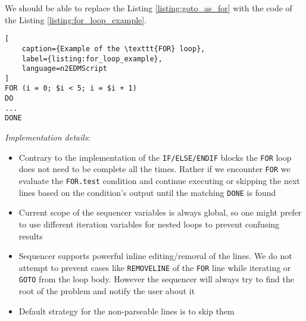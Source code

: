 We should be able to replace the Listing \ref{listing:goto_as_for} with the code of the Listing \ref{listing:for_loop_example}.
\begin{lstlisting}[
	caption={Example of the \texttt{FOR} loop}, 
	label={listing:for_loop_example},
	language=n2EDMScript
]
FOR (i = 0; $i < 5; i = $i + 1)
DO
...
DONE
\end{lstlisting}

\textit{Implementation details}: 

\begin{itemize}
	\item Contrary to the implementation of the \texttt{IF/ELSE/ENDIF} blocks the \texttt{FOR} loop does not need to be complete all the times. Rather if we encounter \texttt{FOR} we evaluate the \texttt{FOR.test} condition and continue executing or skipping the next lines based on the condition's output until the matching \texttt{DONE} is found
	\item Current scope of the sequencer variables is always global, so one might prefer to use different iteration variables for nested loops to prevent confusing results
	\item Sequencer supports powerful inline editing/removal of the lines. We do not attempt to prevent cases like \texttt{REMOVELINE} of the \texttt{FOR} line while iterating or \texttt{GOTO} from the loop body. However the sequencer will always try to find the root of the problem and notify the user about it
	\item Default strategy for the non-parseable lines is to skip them
\end{itemize}

%
%
%
%
%
%
%
